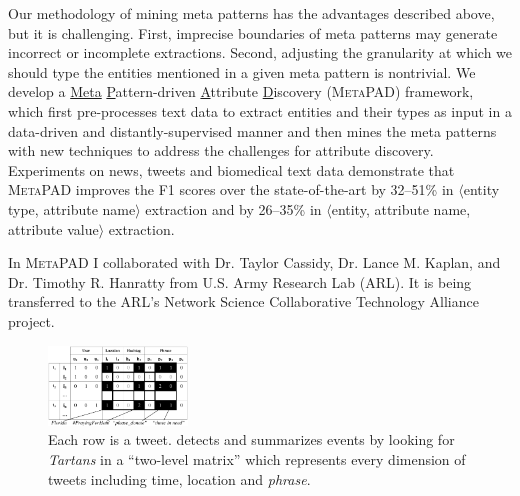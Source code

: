 \documentclass[10.5pt]{article}
\newcommand{\lb}{\mbox{$\langle$}}
\newcommand{\rb}{\mbox{$\rangle$}}
\newcommand{\pair}[2]{{\lb#1, #2\rb}\xspace}
\newcommand{\tuple}[3]{{\lb#1, #2, #3\rb}\xspace}
\begin{document}
Our methodology of mining meta patterns has the advantages described above, but it is challenging. First, imprecise boundaries of meta patterns may generate incorrect or incomplete extractions. Second, adjusting the granularity at which we should type the entities mentioned in a given meta pattern is nontrivial. We develop a \underline{Meta} \underline{P}attern-driven \underline{A}ttribute \underline{D}iscovery (\textsc{MetaPAD}) framework, which first pre-processes text data to extract entities and their types as input in a data-driven and distantly-supervised manner and then mines the meta patterns with new techniques to address the challenges for attribute discovery. Experiments on news, tweets and biomedical text data demonstrate that \textsc{MetaPAD} improves the F1 scores over the state-of-the-art by 32--51\% in \pair{entity type}{attribute name} extraction and by 26--35\% in \tuple{entity}{attribute name}{attribute value} extraction.

\begin{compactitem}
\item In \textsc{MetaPAD} \cite{jiang2016metapad} I collaborated with Dr. Taylor Cassidy, Dr. Lance M. Kaplan, and Dr. Timothy R. Hanratty from U.S. Army Research Lab (ARL). It is being transferred to the ARL's Network Science Collaborative Technology Alliance project. 
\end{compactitem}

\vskip 0.03in
\vskip 0.01in


\begin{figure}
\vskip -0.18in
\includegraphics[width=0.33\textwidth]{figure/catchtartan.pdf}
\vskip -0.18in
\caption{Each row is a tweet. \cite{jiang2016catchtartan} detects and summarizes events by looking for \textit{Tartans} in a ``two-level matrix'' which represents every dimension of tweets including time, location and \textit{phrase}.}
\label{fig:catchtartan}
\vskip -0.20in
\end{figure}
\end{document}
